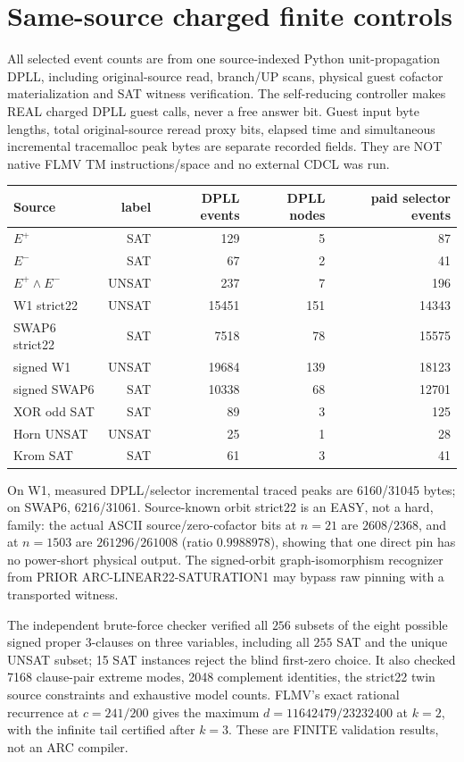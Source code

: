 \documentclass[11pt]{article}
\begin{document}
\section{Same-source charged finite controls}
All selected event counts are from one source-indexed Python unit-propagation DPLL, including original-source read, branch/UP scans, physical guest cofactor materialization and SAT witness verification. The self-reducing controller makes REAL charged DPLL guest calls, never a free answer bit. Guest input byte lengths, total original-source reread proxy bits, elapsed time and simultaneous incremental tracemalloc peak bytes are separate recorded fields. They are NOT native FLMV TM instructions/space and no external CDCL was run.
\begin{center}\small
\begin{tabular}{lrrrr}
\toprule Source&label&DPLL events&DPLL nodes&paid selector events\\\midrule
$E^+$&SAT&129&5&87\\
$E^-$&SAT&67&2&41\\
$E^+\wedge E^-$&UNSAT&237&7&196\\
W1 strict22&UNSAT&15451&151&14343\\
SWAP6 strict22&SAT&7518&78&15575\\
signed W1&UNSAT&19684&139&18123\\
signed SWAP6&SAT&10338&68&12701\\
XOR odd SAT&SAT&89&3&125\\
Horn UNSAT&UNSAT&25&1&28\\
Krom SAT&SAT&61&3&41\\\bottomrule
\end{tabular}\end{center}
On W1, measured DPLL/selector incremental traced peaks are 6160/31045 bytes; on SWAP6, 6216/31061. Source-known orbit strict22 is an EASY, not a hard, family: the actual ASCII source/zero-cofactor bits at $n=21$ are $2608/2368$, and at $n=1503$ are $261296/261008$ (ratio $0.9988978$), showing that one direct pin has no power-short physical output. The signed-orbit graph-isomorphism recognizer from PRIOR ARC-LINEAR22-SATURATION1 may bypass raw pinning with a transported witness.

The independent brute-force checker verified all $256$ subsets of the eight possible signed proper 3-clauses on three variables, including all $255$ SAT and the unique UNSAT subset; 15 SAT instances reject the blind first-zero choice. It also checked 7168 clause-pair extreme modes, 2048 complement identities, the strict22 twin source constraints and exhaustive model counts. FLMV's exact rational recurrence at $c=241/200$ gives the maximum $d=11642479/23232400$ at $k=2$, with the infinite tail certified after $k=3$. These are FINITE validation results, not an ARC compiler.
\end{document}
